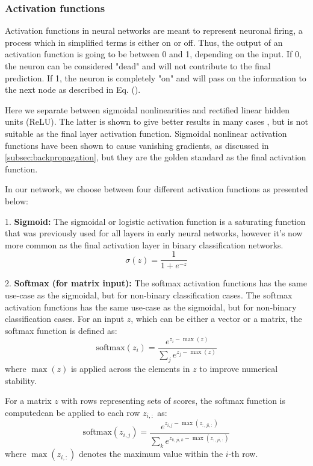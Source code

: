 \subsubsection{Activation functions}\label{sssec:activation_functions}

Activation functions in neural networks are meant to represent neuronal firing, a process which in simplified terms is either on or off. Thus, the output 
of an activation function is going to be between 0 and 1, depending on the input. If 0, the neuron can be considered "dead" and will not contribute 
to the final prediction. If 1, the neuron is completely "on" and will pass on the information to the next node as described in Eq. (\cite{ffnn}). 

Here we separate between sigmoidal nonlinearities and rectified linear hidden units (ReLU). The latter is shown to give better results in many cases 
\cite{relu_best_ever}, but is not suitable as the final layer activation function. Sigmoidal nonlinear activation functions have been shown to 
cause vanishing gradients, as discussed in \ref{subsec:backpropagation}, but they are the golden standard as the final activation function. 

In our network, we choose between four different activation functions as presented below: 

1. \textbf{Sigmoid:}
The sigmoidal or logistic activation function is a saturating function that was previously used for all layers in early neural networks, 
however it's now more common as the final activation layer in binary classification networks.
\[
\sigma(z) = \frac{1}{1 + e^{-z}}
\]

2. \textbf{Softmax (for matrix input):}
The softmax activation functions has the same use-case as the sigmoidal, but for non-binary classification cases. 
The softmax activation functions has the same use-case as the sigmoidal, but for non-binary classification cases. 
For an input \( z \), which can be either a vector or a matrix, the softmax function is defined as:
\[
\text{softmax}(z_i) = \frac{e^{z_i - \max(z)}}{\sum_{j} e^{z_j - \max(z)}}
\]
where \(\max(z)\) is applied across the elements in \( z \) to improve numerical stability.

For a matrix \( z \) with rows representing sets of scores, the softmax function is computedcan be applied to each row \( z_{i,:} \) as:
\[
\text{softmax}(z_{i,j}) = \frac{e^{z_{i,j} - \max(z_{:,ji,:})}}{\sum_{k} e^{z_{k,ji,k} - \max(z_{:,ji,:})}}
\]
where \( \max(z_{i,:}) \) denotes the maximum value within the \( i \)-th row.

